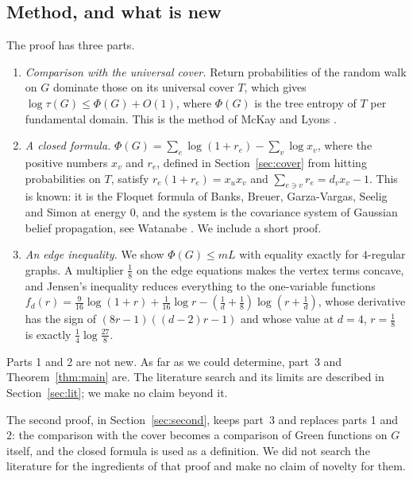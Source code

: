 \documentclass[11pt]{amsart}
\theoremstyle{plain}
\theoremstyle{remark}
\begin{document}
\subsection*{Method, and what is new}
The proof has three parts.
\begin{enumerate}
\item \emph{Comparison with the universal cover.} Return probabilities of the random walk on $G$ dominate those on
  its universal cover $T$, which gives $\log\tau(G)\le\Phi(G)+O(1)$, where $\Phi(G)$ is the tree entropy of $T$ per
  fundamental domain. This is the method of McKay \cite{McKay} and Lyons \cite{Lyons}.
\item \emph{A closed formula.} $\Phi(G)=\sum_e\log(1+r_e)-\sum_v\log x_v$, where the positive numbers $x_v$ and
  $r_e$, defined in Section~\ref{sec:cover} from hitting probabilities on $T$, satisfy $r_e(1+r_e)=x_ux_v$ and
  $\sum_{e\ni v}r_e=d_vx_v-1$. This is known: it is the Floquet formula of
  Banks, Breuer, Garza-Vargas, Seelig and Simon \cite{BBGSS} at energy $0$, and the system is the covariance system
  of Gaussian belief propagation, see Watanabe \cite{Watanabe}. We include a short proof.
\item \emph{An edge inequality.} We show $\Phi(G)\le mL$ with equality exactly for $4$-regular graphs. A
  multiplier $\tfrac18$ on the edge equations makes the vertex terms concave, and Jensen's inequality reduces
  everything to the one-variable functions
  $f_d(r)=\tfrac9{16}\log(1+r)+\tfrac1{16}\log r-(\tfrac1d+\tfrac18)\log(r+\tfrac1d)$, whose derivative has the sign
  of $(8r-1)((d-2)r-1)$ and whose value at $d=4$, $r=\tfrac18$ is exactly $\tfrac14\log\tfrac{27}{8}$.
\end{enumerate}
Parts 1 and 2 are not new. As far as we could determine, part~3 and Theorem~\ref{thm:main} are. The literature
search and its limits are described in Section~\ref{sec:lit}; we make no claim beyond it.

The second proof, in Section~\ref{sec:second}, keeps part~3 and replaces parts 1 and 2: the comparison with the
cover becomes a comparison of Green functions on $G$ itself, and the closed formula is used as a definition.
We did not search the literature for the ingredients of that proof and make no claim of novelty for them.
\end{document}

